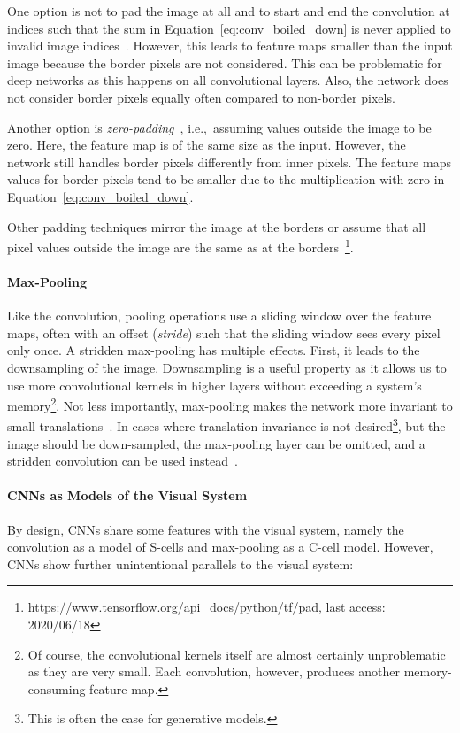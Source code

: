 One option is not to pad the image at all and to start and end the convolution at indices such that the sum in Equation~\ref{eq:conv_boiled_down} is never applied to invalid image indices~\citep[p. 350]{Goodfellow-et-al-2016}.
However, this leads to feature maps smaller than the input image because the border pixels are not considered.
This can be problematic for deep networks as this happens on all convolutional layers.
Also, the network does not consider border pixels equally often compared to non-border pixels.

Another option is \textit{zero-padding}~\citep[p. 350]{Goodfellow-et-al-2016}, i.e.,~assuming values outside the image to be zero.
Here, the feature map is of the same size as the input.
However, the network still handles border pixels differently from inner pixels.
The feature maps values for border pixels tend to be smaller due to the multiplication with zero in Equation~\ref{eq:conv_boiled_down}.

Other padding techniques mirror the image at the borders or assume that all pixel values outside the image are the same as at the borders~\footnote{\href{https://www.tensorflow.org/api\_docs/python/tf/pad}{https://www.tensorflow.org/api\_docs/python/tf/pad}, last access: 2020/06/18}.

\paragraph{Max-Pooling}
Like the convolution, pooling operations use a sliding window over the feature maps, often with an offset (\textit{stride}) such that the sliding window sees every pixel only once.
A stridden max-pooling has multiple effects.
First, it leads to the downsampling of the image.
Downsampling is a useful property as it allows us to use more convolutional kernels in higher layers without exceeding a system's memory\footnote{Of course, the convolutional kernels itself are almost certainly unproblematic as they are very small. Each convolution, however, produces another memory-consuming feature map.}.
Not less importantly, max-pooling makes the network more invariant to small translations~\citep[p. 342]{Goodfellow-et-al-2016}.
In cases where translation invariance is not desired\footnote{This is often the case for generative models.}, but the image should be down-sampled, the max-pooling layer can be omitted, and a stridden convolution can be used instead~\citep[p. 337]{Goodfellow-et-al-2016}.

\paragraph{\acfp{CNN} as Models of the Visual System}
By design, \acp{CNN} share some features with the visual system, namely the convolution as a model of S-cells and max-pooling as a C-cell model.
However, \acp{CNN} show further unintentional parallels to the visual system:

